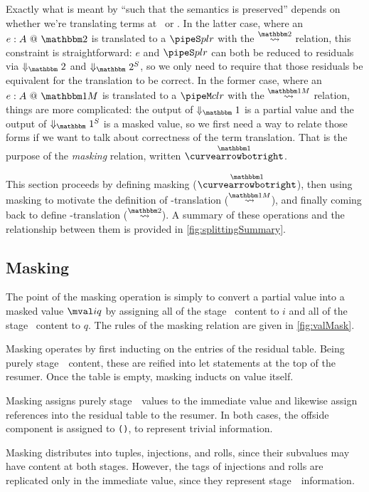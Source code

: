 \begin{abstrsyn}
Exactly what is meant by ``such that the semantics is preserved'' depends on whether we're translating
terms at \bbonem\ or \bbtwo.  
In the latter case, where an $\coltwo e A$ is translated to a $\pipeS p l r$ with the $\splittwosym$ relation,
this constraint is straightforward: $e$ and $\pipeS p l r$ can both be reduced to residuals
via $\redtwosym$ and $\sepredtwosym$, so we only need to require that those
residuals be equivalent for the translation to be correct.
In the former case, where an $\colone e A$ is translated to a $\pipeM c l r$ with the $\splitonesym$ relation, 
things are more complicated: 
the output of $\redonesym$ is a partial value and the output of $\sepredonesym$ is a masked value,
so we first need a way to relate those forms if we want to talk about correctness of the term translation.
That is the purpose of the {\em masking} relation, written $\vsplito$.

This section proceeds by defining masking ($\vsplito$), 
then using masking to motivate the definition of \bbonem-translation ($\splitonesym$),
and finally coming back to define \bbtwo-translation ($\splittwosym$).
A summary of these operations and the relationship between them is provided in \ref{fig:splittingSummary}.

\subsection{Masking}

The point of the masking operation is simply to convert a partial value into a masked value $\mval i q$
by assigning all of the stage \bbone\ content to $i$ and all of the stage \bbtwo\ content to $q$.
The rules of the masking relation are given in \ref{fig:valMask}.

Masking operates by first inducting on the entries of the residual table.  
Being purely stage~\bbtwo\ content, these are reified into let statements at the top of the resumer.
Once the table is empty, masking inducts on value itself.

Masking assigns purely stage~\bbone\ values to the immediate value
and likewise assign references into the residual table to the resumer.
In both cases, the offside component is assigned to \texttt{()}, to represent trivial information.

Masking distributes into tuples, injections, and rolls, since their subvalues may have content at both stages.
However, the tags of injections and rolls are replicated only in the immediate value, 
since they represent stage~\bbone\ information.


\end{abstrsyn}
